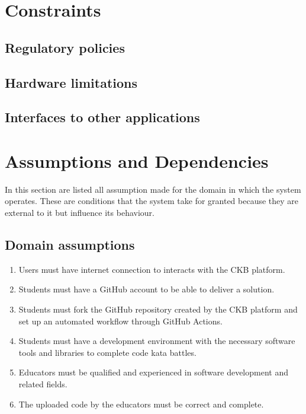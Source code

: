 \section{Constraints}
\subsection{Regulatory policies}
\subsection{Hardware limitations}
\subsection{Interfaces to other applications}

\clearpage

\section{Assumptions and Dependencies}
In this section are listed all assumption made for the domain in which the system operates. These are conditions that the system take for granted because they are external to it but influence its behaviour.

\subsection{Domain assumptions}
\begin{enumerate}[label=\textbf{DA.\arabic*}]
        \item Users must have internet connection to interacts with the CKB platform. 
        \item Students must have a GitHub account to be able to deliver a solution.
        \item Students must fork the GitHub repository created by the CKB platform and set up an automated workflow through GitHub Actions.
        \item Students must have a development environment with the necessary software tools and libraries to complete code kata battles.
        \item Educators must be qualified and experienced in software development and related fields.
        \item The uploaded code by the educators must be correct and complete.
\end{enumerate}
